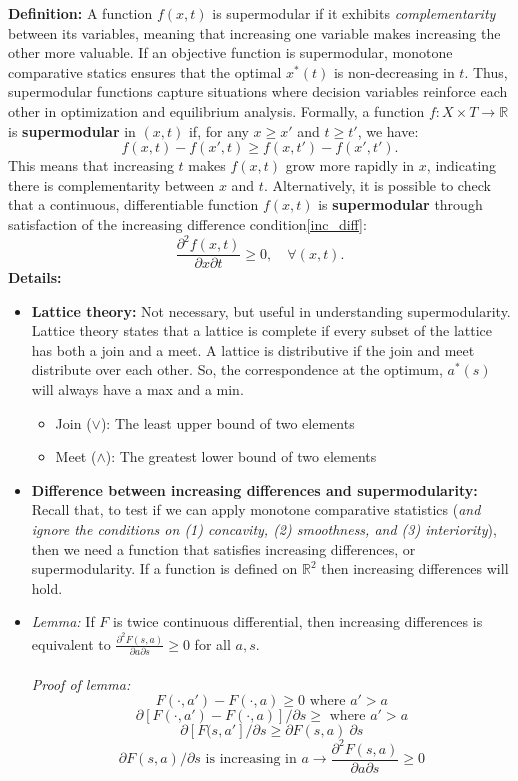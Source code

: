 \documentclass{article}
\begin{document}
\textbf{Definition:} A function \( f(x, t) \) is supermodular if it exhibits \textit{complementarity} between its variables, meaning that increasing one variable makes increasing the other more valuable. If an objective function is supermodular, monotone comparative statics ensures that the optimal \( x^*(t) \) is non-decreasing in \( t \). Thus, supermodular functions capture situations where decision variables reinforce each other in optimization and equilibrium analysis. Formally, a function \( f: X \times T \to \mathbb{R} \) is \textbf{supermodular} in \( (x, t) \) if, for any \( x \geq x' \) and \( t \geq t' \), we have:
\[
f(x, t) - f(x', t) \geq f(x, t') - f(x', t').
\]
This means that increasing \( t \) makes \( f(x, t) \) grow more rapidly in $x$, indicating there is complementarity between \( x \) and \( t \). Alternatively, it is possible to check that a continuous, differentiable function \( f(x, t) \) is \textbf{supermodular} through satisfaction of the increasing difference condition\ref{inc_diff}: 
\[
\frac{\partial^2 f(x, t)}{\partial x \partial t} \geq 0, \quad \forall (x, t).
\]
\vspace{.2cm}
\textbf{Details:}
\begin{itemize}
    \item \textbf{Lattice theory:}\label{lattice} Not necessary, but useful in understanding supermodularity. Lattice theory states that a lattice is complete if every subset of the lattice has both a join and a meet. A lattice is distributive if the join and meet distribute over each other. So, the correspondence at the optimum, $a^*(s)$ will always have a max and a min. 
    \begin{itemize}
        \item Join ($\vee$): The least upper bound of two elements
        \item Meet ($\wedge$): The greatest lower bound of two elements
    \end{itemize}
    \item \textbf{Difference between increasing differences and supermodularity:} Recall that, to test if we can apply monotone comparative statistics (\textit{and ignore the conditions on (1) concavity, (2) smoothness, and (3) interiority}), then we need a function that satisfies increasing differences, or supermodularity. If a function is defined on $\mathbb{R}^2$ then increasing differences will hold. 
    \item \textit{Lemma:} If $F$ is twice continuous differential, then increasing differences is equivalent to $\frac{\partial ^2F(s,a)}{\partial a \partial s} \geq 0$ for all $a,s$. \\
    \\
    \textit{Proof of lemma: }
    \[
    F(\cdot,a') - F(\cdot, a) \geq 0 \text{ where } a' > a
    \]
    \[
    \partial[F(\cdot,a') - F(\cdot, a)]/\partial s \geq \text{ where } a' > a
    \]
    \[
    \partial[F(s,a']/\partial s \geq \partial F(s,a) \ \partial s
    \]
    \[
    \partial F(s,a)/ \partial s \text{ is increasing in } a \rightarrow \frac{\partial ^2 F(s,a)}{\partial a \partial s} \geq 0
    \]
\end{itemize}
\end{document}
